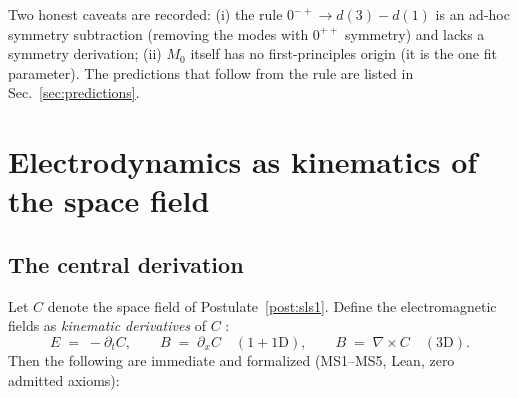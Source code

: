 \documentclass[aps,prd,preprint,superscriptaddress,amsmath,amssymb]{revtex4-2}
\begin{document}
Two honest caveats are recorded: (i) the rule $0^{-+}\to d(3)-d(1)$ is an
ad-hoc symmetry subtraction (removing the modes with $0^{++}$ symmetry) and
lacks a symmetry derivation; (ii) $M_0$ itself has no first-principles
origin (it is the one fit parameter).  The predictions that follow from the
rule are listed in Sec.~\ref{sec:predictions}.

\section{Electrodynamics as kinematics of the space field}\label{sec:em}

\subsection{The central derivation}

Let $C$ denote the space field of Postulate~\ref{post:sls1}.  Define the
electromagnetic fields as \emph{kinematic derivatives} of $C$
\cite{ProjectionPhysics-MS}:
\begin{equation}
\label{eq:kinematic}
E \;=\; -\partial_t C , \qquad
B \;=\; \partial_x C \quad (1{+}1\mathrm{D}), \qquad
B \;=\; \nabla\times C \quad (3\mathrm{D}).
\end{equation}
Then the following are immediate and formalized (MS1--MS5, Lean, zero
admitted axioms):
\end{document}
